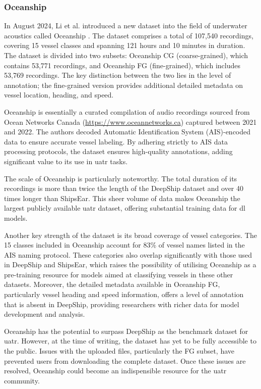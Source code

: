 \subsubsection{Oceanship}\label{subsubsec:oceanship}

In August 2024, Li et al. introduced a new dataset into the field of underwater acoustics called Oceanship \cite{huang_oceanship_2024}. The dataset comprises a total of 107,540 recordings, covering 15 vessel classes and spanning 121 hours and 10 minutes in duration. The dataset is divided into two subsets: Oceanship CG (coarse-grained), which contains 53,771 recordings, and Oceanship FG (fine-grained), which includes 53,769 recordings. The key distinction between the two lies in the level of annotation; the fine-grained version provides additional detailed metadata on vessel location, heading, and speed.

Oceanship is essentially a curated compilation of audio recordings sourced from Ocean Networks Canada (\url{https://www.oceannetworks.ca}) captured between 2021 and 2022. The authors decoded Automatic Identification System (AIS)-encoded data to ensure accurate vessel labeling. By adhering strictly to AIS data processing protocols, the dataset ensures high-quality annotations, adding significant value to its use in \acrshort{uatr} tasks.

The scale of Oceanship is particularly noteworthy. The total duration of its recordings is more than twice the length of the DeepShip dataset and over 40 times longer than ShipsEar. This sheer volume of data makes Oceanship the largest publicly available \acrshort{uatr} dataset, offering substantial training data for \acrlong{dl} models.

Another key strength of the dataset is its broad coverage of vessel categories. The 15 classes included in Oceanship account for 83\% of vessel names listed in the AIS naming protocol. These categories also overlap significantly with those used in DeepShip and ShipsEar, which raises the possibility of utilising Oceanship as a pre-training resource for models aimed at classifying vessels in these other datasets. Moreover, the detailed metadata available in Oceanship FG, particularly vessel heading and speed information, offers a level of annotation that is absent in DeepShip, providing researchers with richer data for model development and analysis.

Oceanship has the potential to surpass DeepShip as the benchmark dataset for \acrshort{uatr}. However, at the time of writing, the dataset has yet to be fully accessible to the public. Issues with the uploaded files, particularly the FG subset, have prevented users from downloading the complete dataset. Once these issues are resolved, Oceanship could become an indispensible resource for the \acrshort{uatr} community.

